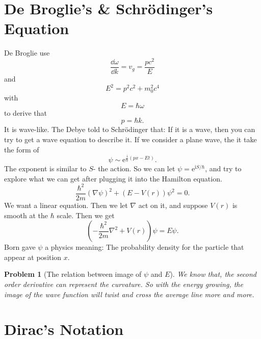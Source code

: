 \documentclass{article}
\theoremstyle{1}
\newtheorem{problem}{Problem}[section]
\newcommand{\ii}{\mathrm{i}}
\newcommand{\ee}{\mathrm{e}}
\begin{document}
\section{ De Broglie's \& Schrödinger's Equation}
De Broglie use 
\begin{equation}
    \frac{\dd{\omega}}{\dd{k}}=v_g=\frac{pc^2}{E}
\end{equation}
and 
\begin{equation}
    E^2=p^2c^2+m_0^2c^4
\end{equation}
with 
\begin{equation}
    E=\hbar\omega
\end{equation}
to derive that 
\begin{equation}
    p=\hbar k.
\end{equation}
It is wave-like. The Debye told to Schrödinger that: If it is a wave, then you can try to get a wave equation to describe it. 
\newline
If we consider a plane wave, the it take the form of 
\begin{equation}
    \psi\sim \ee^{\frac{\ii}{\hbar}\left(px-Et\right)}.
\end{equation}
The exponent is similar to $S$- the action. So we can let $\psi=\ee^{\ii S/\hbar}$, and try to explore what we can get after plugging  it into the Hamilton equation.
\begin{equation}
    \frac{\hbar^2}{2m}\left(\nabla \psi\right)^2+\left(E-V(r)\right)\psi^2=0.
\end{equation}
We want a linear equation. Then we let $\nabla$ act on it, and suppose $V(r)$ is smooth at the $\hbar$ scale. Then we get
\begin{equation}
    \left(-\frac{\hbar^2}{2m}\nabla^2+V(r)\right)\psi=E\psi.
\end{equation}
Born gave $\psi$ a physics meaning: The probability density for the particle that appear at position $x$.
\begin{problem}[The relation between image of $\psi$ and $E$]
    We know that, the second order derivative can represent the curvature. So with the energy growing, the image of the wave function will twist and cross the average line more and more.
    
\end{problem}



\section{Dirac's Notation}
\end{document}
